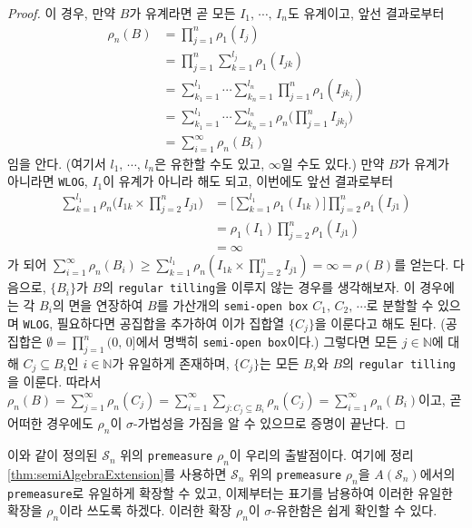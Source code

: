 \begin{proof}
    이 경우, 만약 $B$가 유계라면 곧 모든 $I_1,\,\cdots,\,I_n$도 유계이고, 앞선 결과로부터
    \begin{align*}
        \rho_n(B)&=\prod_{j=1}^n\rho_1(I_j)\\
        &=\prod_{j=1}^n\sum_{k=1}^{l_j}\rho_1(I_{jk})\\
        &=\sum_{k_1=1}^{l_1}\cdots\sum_{k_n=1}^{l_n}\prod_{j=1}^n\rho_1(I_{j{k_j}})\\
        &=\sum_{k_1=1}^{l_1}\cdots\sum_{k_n=1}^{l_n}\rho_n\bigg(\prod_{j=1}^nI_{j{k_j}}\bigg)\\
        &=\sum_{i=1}^\infty\rho_n(B_i)
    \end{align*}
    임을 안다. (여기서 $l_1,\,\cdots,\,l_n$은 유한할 수도 있고, $\infty$일 수도 있다.) 만약 $B$가 유계가 아니라면 \texttt{WLOG}, $I_1$이 유계가 아니라 해도 되고, 이번에도 앞선 결과로부터
    \begin{align*}
        \sum_{k=1}^{l_1}\rho_n\bigg(I_{1k}\times\prod_{j=2}^nI_{j1}\bigg)&=\bigg[\sum_{k=1}^{l_1}\rho_1(I_{1k})\bigg]\prod_{j=2}^n\rho_1(I_{j1})\\
        &=\rho_1(I_1)\prod_{j=2}^n\rho_1(I_{j1})\\
        &=\infty
    \end{align*}
    가 되어 $\sum_{i=1}^\infty\rho_n(B_i)\geq\sum_{k=1}^{l_1}\rho_n(I_{1k}\times\prod_{j=2}^nI_{j1})=\infty=\rho(B)$를 얻는다. 다음으로, $\{B_i\}$가 $B$의 \texttt{regular tilling}을 이루지 않는 경우를 생각해보자. 이 경우에는 각 $B_i$의 면을 연장하여 $B$를 가산개의 \texttt{semi-open box} $C_1,\,C_2,\,\cdots$로 분할할 수 있으며 \texttt{WLOG}, 필요하다면 공집합을 추가하여 이가 집합열 $\{C_j\}$을 이룬다고 해도 된다. (공집합은 $\emptyset = \prod_{j=1}^n(0,\,0]$에서 명백히 \texttt{semi-open box}이다.) 그렇다면 모든 $j\in\mathbb{N}$에 대해 $C_j\subseteq B_i$인 $i\in\mathbb{N}$가 유일하게 존재하며, $\{C_j\}$는 모든 $B_i$와 $B$의 \texttt{regular tilling}을 이룬다. 따라서 $\rho_n(B)=\sum_{j=1}^\infty\rho_n(C_j)=\sum_{i=1}^\infty\sum_{j:C_j\subseteq B_i}\rho_n(C_j)=\sum_{i=1}^\infty\rho_n(B_i)$이고, 곧 어떠한 경우에도 $\rho_n$이 $\sigma$-가법성을 가짐을 알 수 있으므로 증명이 끝난다.
\end{proof}

이와 같이 정의된 $\mathcal{S}_n$ 위의 \texttt{premeasure} $\rho_n$이 우리의 출발점이다. 여기에 정리 \ref{thm:semiAlgebraExtension}를 사용하면 $\mathcal{S}_n$ 위의 \texttt{premeasure} $\rho_n$을 $A(\mathcal{S}_n)$에서의 \texttt{premeasure}로 유일하게 확장할 수 있고, 이제부터는 표기를 남용하여 이러한 유일한 확장을 $\rho_n$이라 쓰도록 하겠다. 이러한 확장 $\rho_n$이 $\sigma$-유한함은 쉽게 확인할 수 있다.

